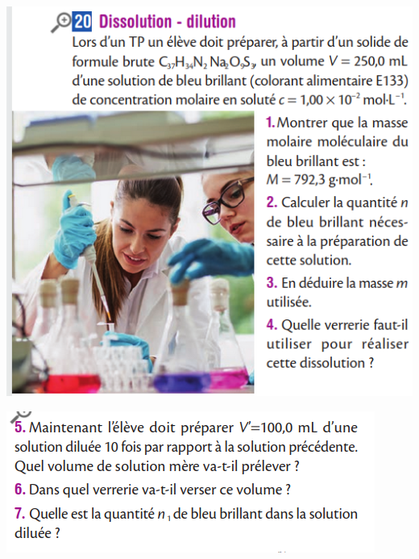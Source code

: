 \documentclass[10pt]{article}
\newcommand{\myscale}{0.41}
\begin{document}
\begin{center}
\begin{minipage}[c]{0.45\textwidth}
		\includegraphics[scale=\myscale]{assets/20a.png}

		\includegraphics[scale=\myscale]{assets/20b.png}


\end{minipage}
\end{center}
\end{document}
